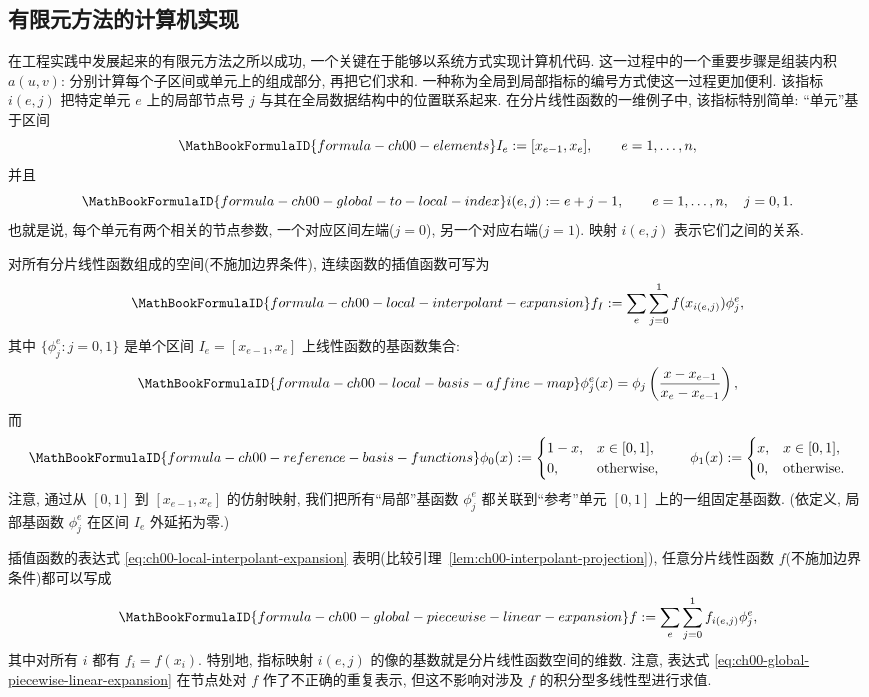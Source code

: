 \subsection{有限元方法的计算机实现}
\label{sec:ch00-computer-implementation}

在工程实践中发展起来的有限元方法之所以成功, 一个关键在于能够以系统方式实现计算机代码. 这一过程中的一个重要步骤是组装内积 $a(u,v)$: 分别计算每个子区间或单元上的组成部分, 再把它们求和. 一种称为全局到局部指标的编号方式使这一过程更加便利. 该指标 $i(e,j)$ 把特定单元 $e$ 上的局部节点号 $j$ 与其在全局数据结构中的位置联系起来. 在分片线性函数的一维例子中, 该指标特别简单: ``单元''基于区间
\[
\MathBookFormulaID{formula-ch00-elements}
I_e:=[x_{e-1},x_e],
\qquad e=1,\ldots,n,
\]
并且
\[
\MathBookFormulaID{formula-ch00-global-to-local-index}
i(e,j):=e+j-1,
\qquad e=1,\ldots,n,\quad j=0,1.
\]
也就是说, 每个单元有两个相关的节点参数, 一个对应区间左端($j=0$), 另一个对应右端($j=1$). 映射 $i(e,j)$ 表示它们之间的关系.

对所有分片线性函数组成的空间(不施加边界条件), 连续函数的插值函数可写为
\setcounter{equation}{0}
\begin{equation}
\MathBookFormulaID{formula-ch00-local-interpolant-expansion}
f_I:=\sum_e\sum_{j=0}^1f(x_{i(e,j)})\phi_j^e,
\label{eq:ch00-local-interpolant-expansion}
\end{equation}
其中 $\{\phi_j^e:j=0,1\}$ 是单个区间 $I_e=[x_{e-1},x_e]$ 上线性函数的基函数集合:
\[
\MathBookFormulaID{formula-ch00-local-basis-affine-map}
\phi_j^e(x)=\phi_j\left(\frac{x-x_{e-1}}{x_e-x_{e-1}}\right),
\]
而
\[
\MathBookFormulaID{formula-ch00-reference-basis-functions}
\phi_0(x):=
\begin{cases}1-x,&x\in[0,1],\\0,&\text{otherwise},\end{cases}
\qquad
\phi_1(x):=
\begin{cases}x,&x\in[0,1],\\0,&\text{otherwise}.
\end{cases}
\]
注意, 通过从 $[0,1]$ 到 $[x_{e-1},x_e]$ 的仿射映射, 我们把所有``局部''基函数 $\phi_j^e$ 都关联到``参考''单元 $[0,1]$ 上的一组固定基函数. (依定义, 局部基函数 $\phi_j^e$ 在区间 $I_e$ 外延拓为零.)

插值函数的表达式 \eqref{eq:ch00-local-interpolant-expansion} 表明(比较引理~\ref{lem:ch00-interpolant-projection}), 任意分片线性函数 $f$(不施加边界条件)都可以写成
\begin{equation}
\MathBookFormulaID{formula-ch00-global-piecewise-linear-expansion}
f:=\sum_e\sum_{j=0}^1 f_{i(e,j)}\phi_j^e,
\label{eq:ch00-global-piecewise-linear-expansion}
\end{equation}
其中对所有 $i$ 都有 $f_i=f(x_i)$. 特别地, 指标映射 $i(e,j)$ 的像的基数就是分片线性函数空间的维数. 注意, 表达式 \eqref{eq:ch00-global-piecewise-linear-expansion} 在节点处对 $f$ 作了不正确的重复表示, 但这不影响对涉及 $f$ 的积分型多线性型进行求值.

